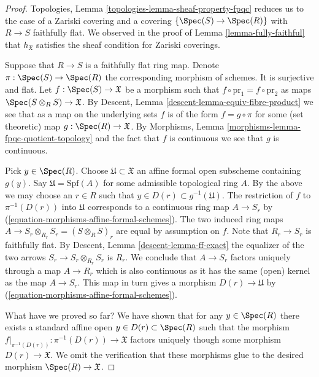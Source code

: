 \begin{proof}
Topologies, Lemma \ref{topologies-lemma-sheaf-property-fpqc}
reduces us to the case of a Zariski covering and a covering
$\{\Spec(S) \to \Spec(R)\}$ with $R \to S$ faithfully flat.
We observed in the proof of Lemma \ref{lemma-fully-faithful} 
that $h_\mathfrak X$ satisfies the sheaf condition for Zariski coverings.

\medskip\noindent
Suppose that $R \to S$ is a faithfully flat ring map.
Denote $\pi : \Spec(S) \to \Spec(R)$ the
corresponding morphism of schemes. It is surjective and flat.
Let $f : \Spec(S) \to \mathfrak X$ be a morphism
such that $f \circ \text{pr}_1 = f \circ \text{pr}_2$
as maps $\Spec(S \otimes_R S) \to \mathfrak X$.
By Descent, Lemma \ref{descent-lemma-equiv-fibre-product}
we see that as a map on the underlying
sets $f$ is of the form $f = g \circ \pi$ for some
(set theoretic) map $g : \Spec(R) \to \mathfrak X$.
By Morphisms, Lemma \ref{morphisms-lemma-fpqc-quotient-topology}
and the fact that $f$ is continuous we see that $g$
is continuous.

\medskip\noindent
Pick $y \in \Spec(R)$. Choose $\mathfrak U \subset \mathfrak X$
an affine formal open subscheme containing $g(y)$.
Say $\mathfrak U = \text{Spf}(A)$ for some admissible topological
ring $A$. By the above we may choose an $r \in R$ such that
$y \in D(r) \subset g^{-1}(\mathfrak U)$.
The restriction of $f$ to $\pi^{-1}(D(r))$ into $\mathfrak U$
corresponds to a continuous ring map $A \to S_r$ by
(\ref{equation-morphisms-affine-formal-schemes}). The two induced ring maps
$A \to S_r \otimes_{R_r} S_r = (S \otimes_R S)_r$ are equal
by assumption on $f$.
Note that $R_r \to S_r$ is faithfully flat.
By Descent, Lemma \ref{descent-lemma-ff-exact} the equalizer of
the two arrows $S_r \to S_r \otimes_{R_r} S_r$ is $R_r$.
We conclude that $A \to S_r$ factors uniquely through a map $A \to R_r$
which is also continuous as it has the same (open) kernel as the
map $A \to S_r$. This map in turn gives a morphism $D(r) \to \mathfrak U$ by
(\ref{equation-morphisms-affine-formal-schemes}).

\medskip\noindent
What have we proved so far? We have shown that for any $y \in \Spec(R)$
there exists a standard affine open
$y \in D(r) \subset \Spec(R)$ such that the morphism
$f|_{\pi^{-1}(D(r))} : \pi^{-1}(D(r)) \to \mathfrak X$ factors uniquely
though some morphism $D(r) \to \mathfrak X$. We omit the
verification that these morphisms glue to the desired
morphism $\Spec(R) \to \mathfrak X$.
\end{proof}

